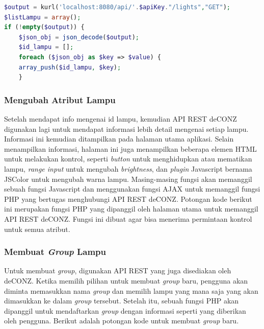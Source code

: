 \begin{lstlisting}[language=PHP,label=code:timer,caption=Mengambil informasi daftar lampu]
$output = kurl('localhost:8080/api/'.$apiKey."/lights","GET");
$listLampu = array();
if (!empty($output)) {
	$json_obj = json_decode($output);
	$id_lampu = [];
	foreach ($json_obj as $key => $value) {
	array_push($id_lampu, $key);
	}
\end{lstlisting}

\subsubsection{Mengubah Atribut Lampu}

Setelah mendapat info mengenai id lampu, kemudian API REST deCONZ digunakan lagi untuk mendapat informasi lebih detail mengenai setiap lampu. Informasi ini kemudian ditampilkan pada halaman utama aplikasi. Selain menampilkan informasi, halaman ini juga menampilkan beberapa elemen HTML untuk melakukan kontrol, seperti \textit{button} untuk menghidupkan atau mematikan lampu, \textit{range input} untuk mengubah \textit{brightness}, dan \textit{plugin} Javascript bernama JSColor untuk mengubah warna lampu. Masing-masing fungsi akan memanggil sebuah fungsi Javascript dan menggunakan fungsi AJAX untuk memanggil fungsi PHP yang bertugas menghubungi API REST deCONZ. Potongan kode berikut ini merupakan fungsi PHP yang dipanggil oleh halaman utama untuk memanggil API REST deCONZ. Fungsi ini dibuat agar bisa menerima permintaan kontrol untuk semua atribut.



\subsubsection{Membuat \textit{Group} Lampu}
Untuk membuat \textit{group}, digunakan API REST yang juga disediakan oleh deCONZ. Ketika memilih pilihan untuk membuat \textit{group} baru, pengguna akan diminta memasukkan nama \textit{group} dan memilih lampu yang mana saja yang akan dimasukkan ke dalam \textit{group} tersebut. Setelah itu, sebuah fungsi PHP akan dipanggil untuk mendaftarkan \textit{group} dengan informasi seperti yang diberikan oleh pengguna. Berikut adalah potongan kode untuk membuat \textit{group} baru.



